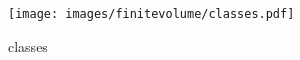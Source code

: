 \begin{figure}[ht]
    \centering
    \texttt{[image: images/finitevolume/classes.pdf]}
    \caption{classes}
    \label{fig:finitevolume-classes}
\end{figure}
